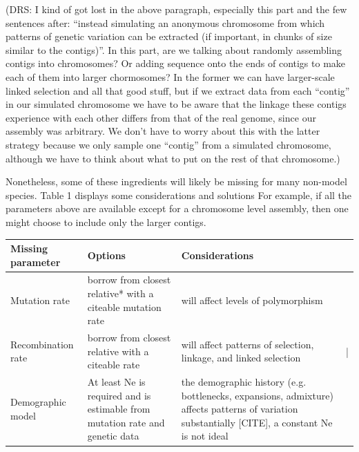 \documentclass[hidelinks]{article}
\begin{document}
(DRS: I kind of got lost in the above paragraph, especially this part and the
few sentences after: ``instead simulating an anonymous chromosome from which patterns
of genetic variation can be extracted (if important, in chunks of size similar
to the contigs)''. In this part, are we talking about randomly assembling contigs
into chromosomes? Or adding sequence onto the ends of contigs to make each of them
into larger chormosomes? In the former we can have larger-scale linked selection
and all that good stuff, but if we extract data from each ``contig'' in our simulated
chromosome we have to be aware that the linkage these contigs experience with each
other differs from that of the real genome, since our assembly was arbitrary. We
don't have to worry about this with the latter strategy because we only sample one
``contig'' from a simulated chromosome, although we have to think about what to put
on the rest of that chromosome.)

Nonetheless, some of these ingredients will likely be missing for many
non-model species. Table 1 displays some considerations and solutions
For example, if all the parameters above are available except for a
chromosome level assembly, then one might choose to include only the
larger contigs.


\begin{table}[]
     \label{tab:title} 
    \begin{tabular}{@{}llll@{}}
    \toprule
    Missing parameter                        & Options                                                                          & Considerations                                                                                                                                       &   \\ \midrule
    \multicolumn{1}{|l|}{Mutation rate}      & \multicolumn{1}{l|}{borrow from closest relative* with a citeable mutation rate} & \multicolumn{1}{l|}{will affect levels of polymorphism}                                                                                              &   \\ \cmidrule(r){1-3}
    \multicolumn{1}{|l|}{Recombination rate} & \multicolumn{1}{l|}{borrow from closest relative with a citeable rate}           & \multicolumn{1}{l|}{will affect patterns of selection, linkage, and linked selection}                                                                & | \\ \cmidrule(r){1-3}
    Demographic model                        & At least Ne is required and is estimable from mutation rate and genetic data     & the demographic history (e.g. bottlenecks, expansions, admixture) affects patterns of variation substantially {[}CITE{]}, a constant Ne is not ideal &   \\ \bottomrule
    \end{tabular}
\end{table}
\end{document}
